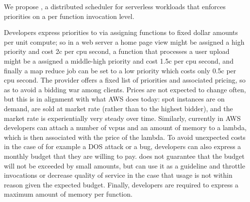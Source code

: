 We propose \sys{}, a distributed scheduler for serverless workloads that enforces
priorities on a per function invocation level.


Developers express priorities to \sys{} via assigning functions to fixed dollar
amounts per unit compute; so in a web server a home page view might be assigned
a high priority and cost 2c per cpu second, a function that processes a user
upload might be a assigned a middle-high priority and cost 1.5c per cpu second,
and finally a map reduce job can be set to a low priority which costs only 0.5c
per cpu second. The provider offers a fixed list of priorities and associated
pricing, so as to avoid a bidding war among clients. Prices are not expected to
change often, but this is in alignment with what AWS does today: spot instances
are on demand, are sold at market rate (rather than to the highest bidder), and
the market rate is experientially very steady over time. Similarly, currently in
AWS developers can attach a number of vcpus and an amount of memory to a lambda,
which is then associated with the price of the lambda. To avoid unexpected costs
in the case of for example a DOS attack or a bug, developers can also express a
monthly budget that they are willing to pay. \sys{} does not guarantee that the
budget will not be exceeded by small amounts, but can use it as a guideline and
throttle invocations or decrease quality of service in the case that usage is
not within reason given the expected budget. Finally, developers are required to
express a maximum amount of memory per function. 

